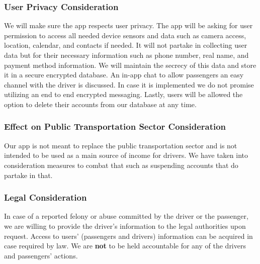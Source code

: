 \documentclass[a4paper, 12pt]{report} %
\begin{document}
                \subsubsection{User Privacy Consideration}
                    We will make sure the app respects user privacy. The app will be asking for user permission to access all needed device sensors and data such as camera access, location, calendar, and contacts if needed. It will not partake in collecting user data but for their necessary information such as phone number, real name, and payment method information. We will maintain the secrecy of this data and store it in a secure encrypted database. An in-app chat to allow passengers an easy channel with the driver is discussed. In case it is implemented we do not promise utilizing an end to end encrypted messaging. Lastly, users will be allowed the option to delete their accounts from our database at any time. 
                \subsubsection{Effect on Public Transportation Sector Consideration}
                    Our app is not meant to replace the public transportation sector and is not intended to be used as a main source of income for drivers. We have taken into consideration measures to combat that such as suspending accounts that do partake in that.
                \subsubsection{Legal Consideration}
                    In case of a reported felony or abuse committed by the driver or the passenger, we are willing to provide the driver's information to the legal authorities upon request. Access to users' (passengers and drivers) information can be acquired in case required by law. We are \textbf{not} to be held accountable for any of the drivers and passengers' actions.

        \pagebreak
\end{document}
